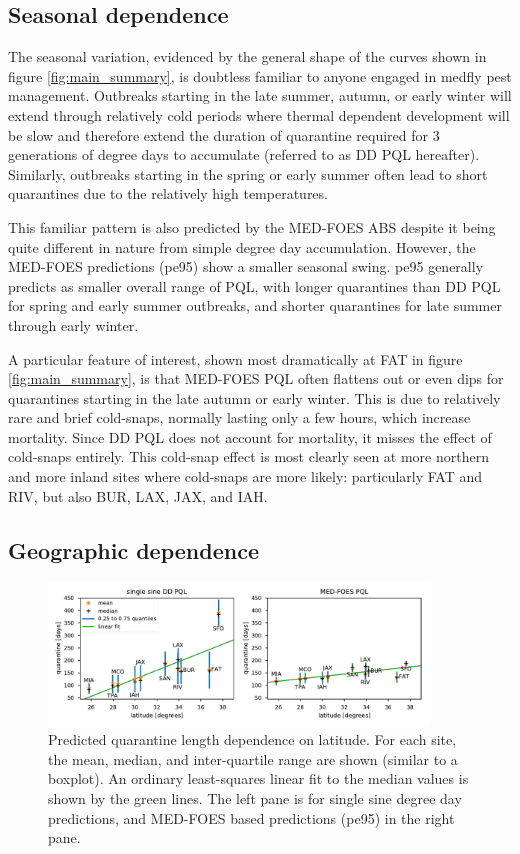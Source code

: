 \documentclass[10pt,a4paper,twocolumn]{article}
\begin{document}
\subsection*{Seasonal dependence}

The seasonal variation, evidenced by the general shape of the curves shown in figure \ref{fig:main_summary}, 
is doubtless familiar to anyone engaged in medfly pest management.
Outbreaks starting in the late summer, autumn, or early winter will extend through relatively cold periods
where thermal dependent development will be slow and therefore extend the duration of quarantine required
for 3 generations of degree days to accumulate (referred to as DD PQL hereafter).
Similarly, outbreaks starting in the spring or early summer often lead to short quarantines due
to the relatively high temperatures.

This familiar pattern is also predicted by the MED-FOES ABS despite it being quite different in nature
from simple degree day accumulation.
However, the MED-FOES predictions (pe95) show a smaller seasonal swing.
pe95 generally predicts as smaller overall range of PQL,
with longer quarantines than DD PQL for spring and early summer outbreaks,
and shorter quarantines for late summer through early winter.

A particular feature of interest, shown most dramatically at FAT in figure \ref{fig:main_summary},
is that MED-FOES PQL often flattens out or even dips for quarantines starting in the late 
autumn or early winter.  This is due to relatively rare and brief cold-snaps,
normally lasting only a few hours, which increase mortality.
Since DD PQL does not account for mortality, it misses the effect of cold-snaps entirely.
This cold-snap effect is most clearly seen at more northern and 
more inland sites where cold-snaps are more likely: 
particularly FAT and RIV, but also BUR, LAX, JAX, and IAH.

\subsection*{Geographic dependence}

\begin{figure}[ht!]
\centering
\includegraphics[width=0.9\textwidth]{figs/fig_latitude_trend_withSFO.pdf}
\caption{\label{fig:latitude_trend} Predicted quarantine length dependence on latitude.
For each site, the mean, median, and inter-quartile range are shown (similar to a boxplot).
An ordinary least-squares linear fit to the median values is shown by the green lines.
The left pane is for single sine degree day predictions,
and MED-FOES based predictions (pe95) in the right pane.
}
\end{figure}
\end{document}
